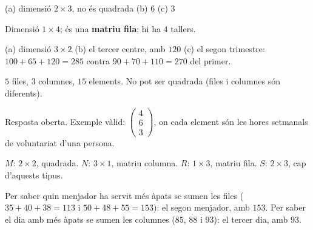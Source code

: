 \begin{solucions}
\begin{sollist}
  \item (a) dimensió $2\times 3$, no és quadrada \quad (b) $6$ \quad (c) $3$
  \item Dimensió $1\times 4$; és una \textbf{matriu fila}; hi ha $4$ tallers.
  \item (a) dimensió $3\times 2$ \quad (b) el tercer centre, amb $120$ \quad
        (c) el segon trimestre: $100+65+120=285$ contra $90+70+110=270$ del primer.
  \item $5$ files, $3$ columnes, $15$ elements. No pot ser quadrada (files i
        columnes són diferents).
  \item Resposta oberta. Exemple vàlid:
        $\begin{pmatrix} 4 \\ 6 \\ 3 \end{pmatrix}$, on cada element són les hores
        setmanals de voluntariat d'una persona.
  \item $M$: $2\times 2$, quadrada. \;$N$: $3\times 1$, matriu columna. \;
        $R$: $1\times 3$, matriu fila. \;$S$: $2\times 3$, cap d'aquests tipus.
  \item Per saber quin menjador ha servit més àpats se sumen les files
        ($35+40+38=113$ i $50+48+55=153$): el segon menjador, amb $153$. Per saber
        el dia amb més àpats se sumen les columnes ($85$, $88$ i $93$): el tercer
        dia, amb $93$.
\end{sollist}
\end{solucions}
